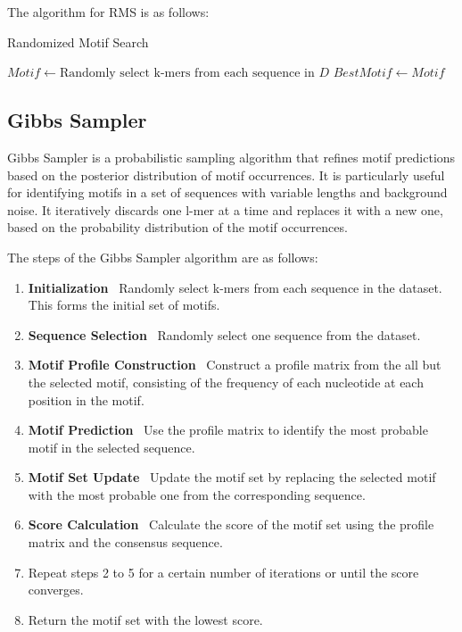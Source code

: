 The algorithm for RMS is as follows:

\begin{algorithm}[!h]
	\caption{Randomized Motif Search}\label{alg:rms}
	$Motif \gets \text{Randomly select k-mers from each sequence in } D$\;
	$BestMotif \gets Motif$\;
\end{algorithm}

\subsection{Gibbs Sampler}

Gibbs Sampler is a probabilistic sampling algorithm that refines motif predictions based on the posterior distribution of motif occurrences. It is particularly useful for identifying motifs in a set of sequences with variable lengths and background noise. It iteratively discards one l-mer at a time and replaces it with a new one, based on the probability distribution of the motif occurrences.

The steps of the Gibbs Sampler algorithm are as follows:

\begin{enumerate}
	\item \textbf{Initialization} \ Randomly select k-mers from each sequence in the dataset. This forms the initial set of motifs.
	\item \textbf{Sequence Selection} \ Randomly select one sequence from the dataset.
	\item \textbf{Motif Profile Construction} \ Construct a profile matrix from the  all but the selected motif, consisting of the frequency of each nucleotide at each position in the motif.
	\item \textbf{Motif Prediction} \ Use the profile matrix to identify the most probable motif in the selected sequence.
	\item \textbf{Motif Set Update} \ Update the motif set by replacing the selected motif with the most probable one from the corresponding sequence.
	\item \textbf{Score Calculation} \ Calculate the score of the motif set using the profile matrix and the consensus sequence.
	\item Repeat steps 2 to 5 for a certain number of iterations or until the score converges.
	\item Return the motif set with the lowest score.
\end{enumerate}

